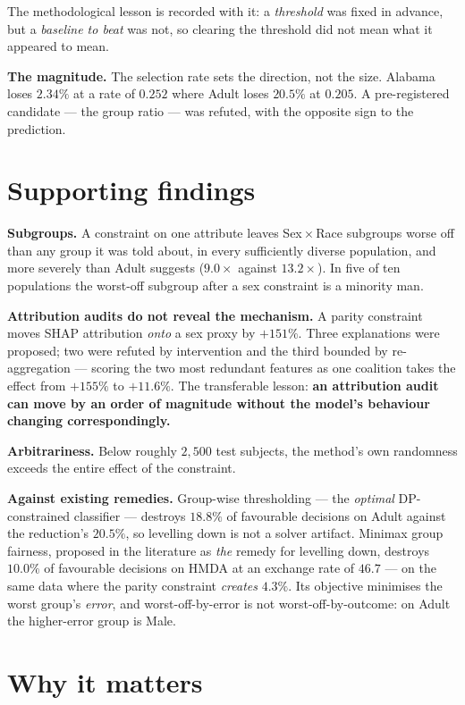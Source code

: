 \documentclass[11pt,a4paper]{article}
\newcommand{\claim}[1]{\medskip\noindent\textbf{#1}\quad}
\begin{document}
The methodological lesson is recorded with it: a \emph{threshold} was fixed in advance, but
a \emph{baseline to beat} was not, so clearing the threshold did not mean what it appeared
to mean.

\claim{The magnitude.} The selection rate sets the direction, not the size. Alabama loses
$2.34\%$ at a rate of $0.252$ where Adult loses $20.5\%$ at $0.205$. A pre-registered
candidate --- the group ratio --- was refuted, with the opposite sign to the prediction.

\section{Supporting findings}

\claim{Subgroups.} A constraint on one attribute leaves Sex\,$\times$\,Race subgroups worse
off than any group it was told about, in every sufficiently diverse population, and more
severely than Adult suggests ($9.0\times$ against $13.2\times$). In five of ten populations
the worst-off subgroup after a sex constraint is a minority man.

\claim{Attribution audits do not reveal the mechanism.} A parity constraint moves SHAP
attribution \emph{onto} a sex proxy by $+151\%$. Three explanations were proposed; two were
refuted by intervention and the third bounded by re-aggregation --- scoring the two most
redundant features as one coalition takes the effect from $+155\%$ to $+11.6\%$. The
transferable lesson: \textbf{an attribution audit can move by an order of magnitude without
the model's behaviour changing correspondingly.}

\claim{Arbitrariness.} Below roughly $2{,}500$ test subjects, the method's own randomness
exceeds the entire effect of the constraint.

\claim{Against existing remedies.} Group-wise thresholding --- the \emph{optimal}
DP-constrained classifier --- destroys $18.8\%$ of favourable decisions on Adult against the
reduction's $20.5\%$, so levelling down is not a solver artifact. Minimax group fairness,
proposed in the literature as \emph{the} remedy for levelling down, destroys $10.0\%$ of
favourable decisions on HMDA at an exchange rate of $46.7$ --- on the same data where the
parity constraint \emph{creates} $4.3\%$. Its objective minimises the worst group's
\emph{error}, and worst-off-by-error is not worst-off-by-outcome: on Adult the higher-error
group is Male.

\section{Why it matters}
\end{document}

